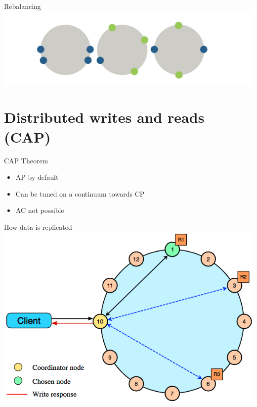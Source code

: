 \documentclass[
  10pt
]{beamer}
\begin{document}
\begin{frame}{Rebalancing}
  \includegraphics[width=1.0\textwidth]{resources/rebalancing.png}
\end{frame}

\section{Distributed writes and reads (CAP)}  %

\begin{frame}{CAP Theorem}
  \begin{itemize}
    \item AP by default
    \item Can be tuned on a continuum towards CP
    \item AC not possible  %
  \end{itemize}
\end{frame}

\begin{frame}{How data is replicated}
  \includegraphics[width=1.0\textwidth]{resources/distributed_write.png}
\end{frame}
\end{document}
